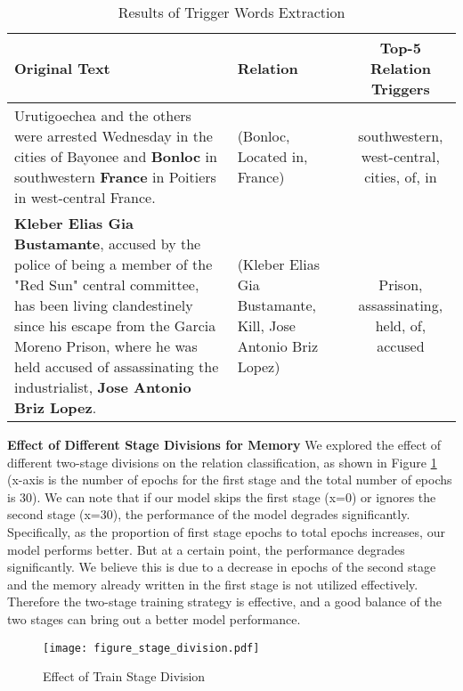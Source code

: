 \documentclass[sigconf]{acmart}
\begin{document}
\begin{table*}
\small
  \begin{tabular}{@{}m{7.8cm}m{4cm}c@{}}
  \toprule
 	Original Text & Relation & Top-5 Relation Triggers \\ \midrule
 	Urutigoechea and the others were arrested Wednesday in the cities of Bayonee and \textbf{Bonloc} in southwestern \textbf{France} in Poitiers in west-central France.  & (Bonloc, Located in, France) & southwestern, west-central, cities, of, in  \\
\textbf{Kleber Elias Gia Bustamante}, accused by the police of being a member of the "Red Sun" central committee, has been living clandestinely since his escape from the Garcia Moreno Prison, where he was held accused of assassinating the industrialist, \textbf{Jose Antonio Briz Lopez}.  & (Kleber Elias Gia Bustamante, Kill, Jose Antonio Briz Lopez) & Prison, assassinating, held, of, accused\\
   \bottomrule
 \end{tabular}
 \caption{Results of Trigger Words Extraction}
 \label{tab:trigger_extraction}
\end{table*}

\noindent\textbf{Effect of Different Stage Divisions for Memory}
We explored the effect of different two-stage divisions on the relation classification, as shown in Figure \ref{fig:stage_division} (x-axis is the number of epochs for the first stage and the total number of epochs is 30). We can note that if our model skips the first stage (x=0) or ignores the second stage (x=30), the performance of the model degrades significantly. Specifically, as the proportion of first stage epochs to total epochs increases, our model performs better. But at a certain point, the performance degrades significantly. We believe this is due to a decrease in epochs of the second stage and the memory already written in the first stage is not utilized effectively. Therefore the two-stage training strategy is effective, and a good balance of the two stages can bring out a better model performance. 

\begin{figure}[h]
  \centering
  \texttt{[image: figure\_stage\_division.pdf]}
  \caption{Effect of Train Stage Division}
   \label{fig:stage_division}
\end{figure}
\end{document}
